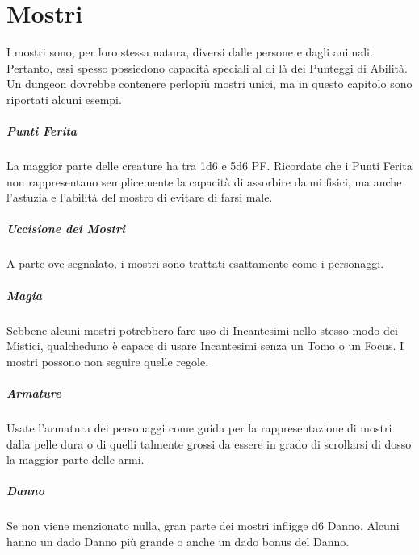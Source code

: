 \documentclass[itdr]{subfiles}
\begin{document}
\cleartoleftpage

\chapter{Mostri}
\label{ch:mostri}

I mostri sono, per loro stessa natura, diversi dalle persone e dagli animali. Pertanto, essi spesso possiedono capacità speciali al di là dei Punteggi di Abilità. Un dungeon dovrebbe contenere perlopiù mostri unici, ma in questo capitolo sono riportati alcuni esempi.

\vfill
{}
\paragraph{Punti Ferita}
La maggior parte delle creature ha tra 1d6 e 5d6 PF. Ricordate che i Punti Ferita non rappresentano semplicemente la capacità di assorbire danni fisici, ma anche l'astuzia e l'abilità del mostro di evitare di farsi male.

\vfill
\paragraph{Uccisione dei Mostri}
A parte ove segnalato, i mostri sono trattati esattamente come i personaggi.

\vfill
{}
\paragraph{Magia}
Sebbene alcuni mostri potrebbero fare uso di Incantesimi nello stesso modo dei Mistici, qualcheduno è capace di usare Incantesimi senza un Tomo o un Focus. I mostri possono non seguire quelle regole.

\vfill
{}
\paragraph{Armature}
Usate l'armatura dei personaggi come guida per la rappresentazione di mostri dalla pelle dura o di quelli talmente grossi da essere in grado di scrollarsi di dosso la maggior parte delle armi.

\vfill
{}
\paragraph{Danno}
Se non viene menzionato nulla, gran parte dei mostri infligge d6 Danno. Alcuni hanno un dado Danno più grande o anche un dado bonus del Danno.
\end{document}
